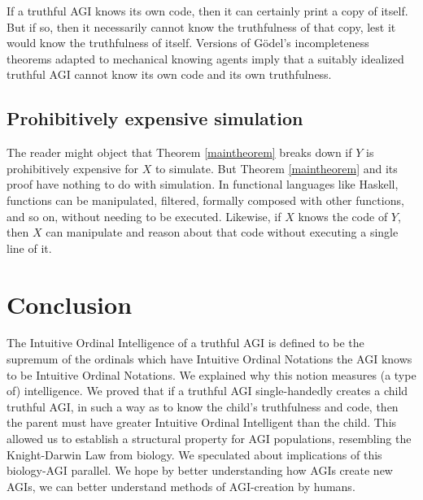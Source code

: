 \documentclass[runningheads]{llncs}
\begin{document}

If a truthful AGI knows its own code,
then it can certainly print a copy of itself.
But if so, then it necessarily cannot know the truthfulness of that
copy, lest it would know the truthfulness of itself.
Versions of G\"odel's incompleteness theorems adapted \cite{reinhardt1985absolute} to
mechanical knowing agents imply that a suitably idealized truthful AGI cannot know
its own code
and its own truthfulness.

\subsection{Prohibitively expensive simulation}

The reader might object that Theorem \ref{maintheorem} breaks down if $Y$ is prohibitively
expensive for $X$ to simulate. But Theorem \ref{maintheorem} and its
proof have nothing to do with simulation. In functional languages like
Haskell, functions can be manipulated, filtered,
formally composed with other functions, and so on, without needing
to be executed.
Likewise, if $X$ knows the code
of $Y$, then $X$ can manipulate and reason about that code without executing a single line
of it.



\section{Conclusion}
\label{conclusionsection}

The Intuitive Ordinal Intelligence of a truthful AGI is defined to be the supremum of the
ordinals which have Intuitive Ordinal Notations the AGI knows to be Intuitive Ordinal
Notations. We explained why this notion measures (a type of) intelligence.
We proved that if a truthful AGI single-handedly creates
a child truthful AGI, in such a way as to know the child's truthfulness and code,
then the parent must have greater Intuitive Ordinal Intelligent than the child. This
allowed us to establish a structural property for AGI populations,
resembling the Knight-Darwin
Law from biology. We speculated about implications of this biology-AGI parallel.
We hope by better understanding
how AGIs create new AGIs, we can better
understand methods of AGI-creation by humans.
\end{document}
